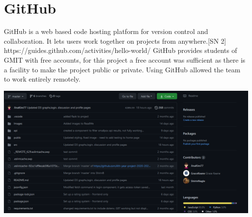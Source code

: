 \section{GitHub}
GitHub is a web based code hosting platform for version control and collaboration. It lets users work together on projects from anywhere.[SN 2] https://guides.github.com/activities/hello-world/
GitHub provides students of GMIT with free accounts, for this project a free account was sufficient as there is a facility to make the project public or private. Using GitHub allowed the team to work entirely remotely.
\begin{center}    
      \includegraphics[scale=0.5]{img/github.PNG}
\end{center}

